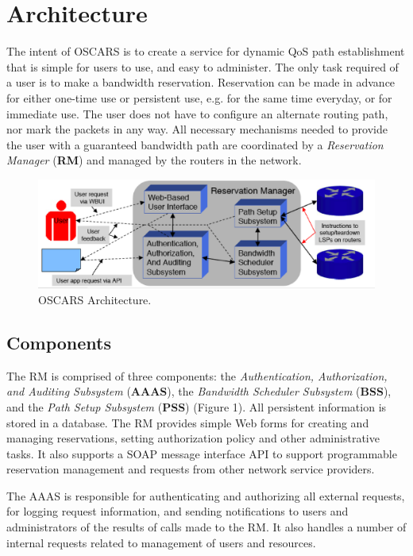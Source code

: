 \documentclass[conference]{IEEEtran}
\begin{document}
\section{Architecture}

The intent of OSCARS is to create a service for dynamic QoS path establishment
that is simple for users to use, and easy to administer.  The only task 
required of a user is to make a bandwidth reservation.  Reservation can be made 
in advance for either one-time use or persistent use, e.g. for the same time 
everyday, or for immediate use. The user does not have 
to configure an alternate routing path, nor mark the packets in any way.  All 
necessary mechanisms needed to provide the user with a guaranteed bandwidth 
path are coordinated by a  \emph{Reservation Manager} (\textbf{RM}) and 
managed by the routers in the network.

\begin{figure}
 \centering 
   \includegraphics[scale=0.3]{pict1.eps}
   \caption{OSCARS Architecture.}
 \label{fig:oscars_arch}
\end{figure}

\subsection{Components}

The RM is comprised of three components:  the 
 \emph{Authentication, Authorization, and Auditing Subsystem} (\textbf{AAAS}), 
the  \emph{Bandwidth Scheduler Subsystem} (\textbf{BSS}), and the  \emph{Path 
Setup Subsystem} (\textbf{PSS}) (Figure 1). All persistent information is 
stored in a database.  
The RM provides simple Web forms for creating and managing reservations, 
setting authorization policy and other administrative tasks.
It also supports a SOAP message interface API to support programmable 
reservation management and requests from other network service providers.

The AAAS is responsible for authenticating and authorizing all external 
requests, for logging request information, and sending notifications to
users and administrators of the results of calls made to the RM.  It also
handles a number of internal requests related to management of users 
and resources.
\end{document}
